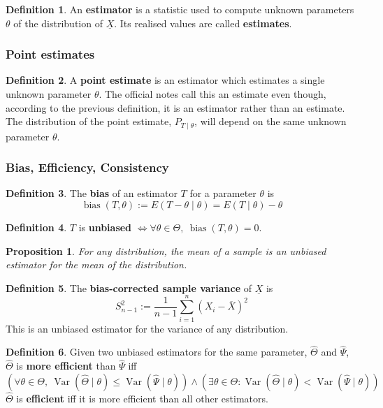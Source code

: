 \documentclass[12pt]{article}
\newtheorem*{prop*}{Proposition}
\theoremstyle{definition}
\newtheorem*{defn*}{Definition}
\DeclareMathOperator{\Var}{Var}
\DeclareMathOperator{\bias}{bias}
\begin{document}
\begin{defn*}
  An \textbf{estimator} is a statistic used to compute unknown parameters $\theta$ of the distribution of $\underline{X}$.
  Its realised values are called \textbf{estimates}.
\end{defn*}

\subsubsection{Point estimates}

\begin{defn*}
  A \textbf{point estimate} is an estimator which estimates a single unknown parameter $\theta$.
  The official notes call this an estimate even though, according to the previous definition, it is an estimator rather than an estimate.
  The distribution of the point estimate, $P_{T \mid \theta}$, will depend on the same unknown parameter $\theta$.
\end{defn*}

\subsubsection{Bias, Efficiency, Consistency}

\begin{defn*}
  The \textbf{bias} of an estimator $T$ for a parameter $\theta$ is
  $$\bias(T, \theta) := E(T - \theta \mid \theta) = E(T \mid \theta) - \theta$$
\end{defn*}

\begin{defn*}
  $T$ is \textbf{unbiased} $\iff \forall \theta \in \Theta,\ \bias(T, \theta) = 0$.
\end{defn*}

\begin{prop*}
  For any distribution, the mean of a sample is an unbiased estimator for the mean of the distribution.
\end{prop*}

\begin{defn*}
  The \textbf{bias-corrected sample variance} of $\underline{X}$ is
  $$S_{n - 1}^2 := \frac{1}{n - 1}\sum_{i = 1}^n(X_i - \overline{X})^2$$
  This is an unbiased estimator for the variance of any distribution.
\end{defn*}

\begin{defn*}
  Given two unbiased estimators for the same parameter, $\widehat{\Theta}$ and $\widehat{\Psi}$, $\widehat{\Theta}$ is \textbf{more efficient} than $\widehat{\Psi}$ iff
  $$\left(\forall \theta \in \Theta,\ \Var\left(\widehat{\Theta} \mid \theta\right) \leq \Var\left(\widehat{\Psi} \mid \theta\right)\right) \land \left(\exists \theta \in \Theta : \Var\left(\widehat{\Theta} \mid \theta\right) < \Var\left(\widehat{\Psi} \mid \theta\right)\right)$$
  $\widehat{\Theta}$ is \textbf{efficient} iff it is more efficient than all other estimators.
\end{defn*}
\end{document}
